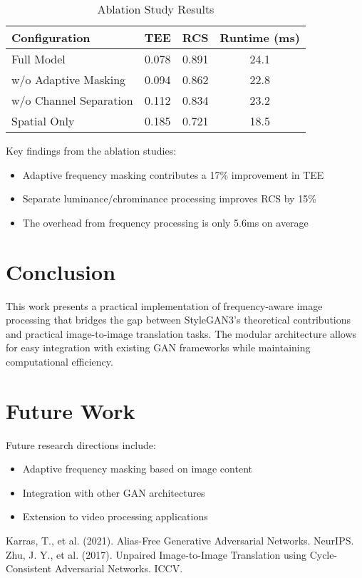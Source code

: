 \documentclass{article}
\begin{document}
\begin{table}[h]
\centering
\caption{Ablation Study Results}
\begin{tabular}{lccc}
\hline
Configuration & TEE & RCS & Runtime (ms) \\
\hline
Full Model & 0.078 & 0.891 & 24.1 \\
w/o Adaptive Masking & 0.094 & 0.862 & 22.8 \\
w/o Channel Separation & 0.112 & 0.834 & 23.2 \\
Spatial Only & 0.185 & 0.721 & 18.5 \\
\hline
\end{tabular}
\end{table}

Key findings from the ablation studies:
\begin{itemize}
\item Adaptive frequency masking contributes a 17\% improvement in TEE
\item Separate luminance/chrominance processing improves RCS by 15\%
\item The overhead from frequency processing is only 5.6ms on average
\end{itemize}

\section{Conclusion}
This work presents a practical implementation of frequency-aware image processing that bridges the gap between StyleGAN3's theoretical contributions and practical image-to-image translation tasks. The modular architecture allows for easy integration with existing GAN frameworks while maintaining computational efficiency.

\section{Future Work}
Future research directions include:
\begin{itemize}
\item Adaptive frequency masking based on image content
\item Integration with other GAN architectures
\item Extension to video processing applications
\end{itemize}


\begin{thebibliography}{9}
 Karras, T., et al. (2021). Alias-Free Generative Adversarial Networks. NeurIPS.
 Zhu, J. Y., et al. (2017). Unpaired Image-to-Image Translation using Cycle-Consistent Adversarial Networks. ICCV.
\end{thebibliography}
\end{document}
